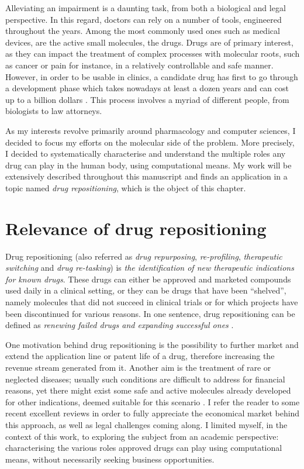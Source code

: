 Alleviating an impairment is a daunting task, from both a biological and legal perspective. In this regard, doctors can rely on a number of tools, engineered throughout the years. Among the most commonly used ones such as medical devices, are the active small molecules, the drugs. Drugs are of primary interest, as they can impact the treatment of complex processes with molecular roots, such as cancer or pain for instance, in a relatively controllable and safe manner. However, in order to be usable in clinics, a candidate drug has first to go through a development phase which takes nowadays at least a dozen years and can cost up to a billion dollars \citep{dimasi2001new}. This process involves a myriad of different people, from biologists to law attorneys.

As my interests revolve primarily around pharmacology and computer sciences, I decided to focus my efforts on the molecular side of the problem. More precisely, I decided to systematically characterise and understand the multiple roles any drug can play in the human body, using computational means. My work will be extensively described throughout this manuscript and finds an application in a topic named \emph{drug repositioning}, which is the object of this chapter.

\section{Relevance of drug repositioning}

Drug repositioning (also referred as \emph{drug repurposing}, \emph{re-profiling}, \emph{therapeutic switching} and \emph{drug re-tasking}) is \emph{the identification of new therapeutic indications for known drugs}. These drugs can either be approved and marketed compounds used daily in a clinical setting, or they can be drugs that have been ``shelved'', namely molecules that did not succeed in clinical trials or for which projects have been discontinued for various reasons. In one sentence, drug repositioning can be defined as \emph{renewing failed drugs and expanding successful ones} \citep{barratt2012drug}.

One motivation behind drug repositioning is the possibility to further market and extend the application line or patent life of a drug, therefore increasing the revenue stream generated from it. Another aim is the treatment of rare or neglected diseases; usually such conditions are difficult to address for financial reasons, yet there might exist some safe and active molecules already developed for other indications, deemed suitable for this scenario \citep{men20101}. I refer the reader to some recent excellent reviews \citep{ashburn2004drug} \citep{dudley2011exploiting} \citep{hurle2013computational} in order to fully appreciate the economical market behind this approach, as well as legal challenges coming along. I limited myself, in the context of this work, to exploring the subject from an academic perspective: characterising the various roles approved drugs can play using computational means, without necessarily seeking business opportunities.

